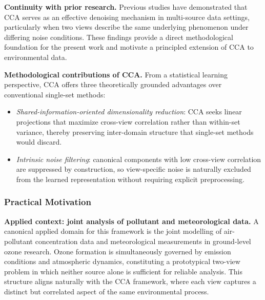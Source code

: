 \textbf{Continuity with prior research.}
Previous studies have demonstrated that CCA serves as an effective 
denoising mechanism in multi-source data settings, particularly when 
two views describe the same underlying phenomenon under differing 
noise conditions. These findings provide a direct methodological 
foundation for the present work and motivate a principled extension 
of CCA to environmental data.

\textbf{Methodological contributions of CCA.}
From a statistical learning perspective, CCA offers three 
theoretically grounded advantages over conventional single-set 
methods:
\begin{itemize}
    \item \textit{Shared-information-oriented dimensionality 
    reduction}: CCA seeks linear projections that maximize 
    cross-view correlation rather than within-set variance, 
    thereby preserving inter-domain structure that single-set 
    methods would discard.

    \item \textit{Intrinsic noise filtering}: canonical components 
    with low cross-view correlation are suppressed by construction, 
    so view-specific noise is naturally excluded from the learned 
    representation without requiring explicit preprocessing.
\end{itemize}

\subsubsection{Practical Motivation}

\textbf{Applied context: joint analysis of pollutant and 
meteorological data.}
A canonical applied domain for this framework is the joint 
modelling of air-pollutant concentration data and meteorological 
measurements in ground-level ozone research.
Ozone formation is simultaneously governed by emission conditions 
and atmospheric dynamics, constituting a prototypical two-view 
problem in which neither source alone is sufficient for reliable 
analysis.
This structure aligns naturally with the CCA framework, where each 
view captures a distinct but correlated aspect of the same 
environmental process.

